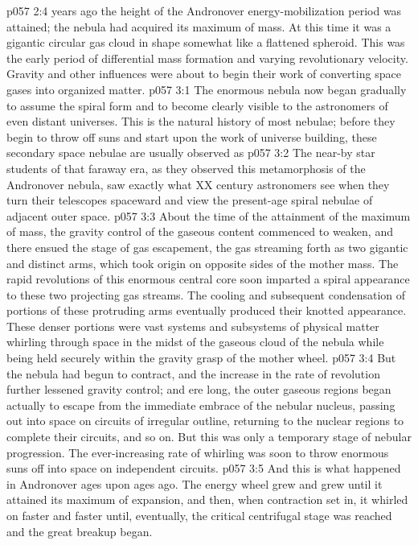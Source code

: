\vs p057 2:4 \pc {} years ago the height of the Andronover energy\hyp{}mobilization period was attained; the nebula had acquired its maximum of mass. At this time it was a gigantic circular gas cloud in shape somewhat like a flattened spheroid. This was the early period of differential mass formation and varying revolutionary velocity. Gravity and other influences were about to begin their work of converting space gases into organized matter.
\vs p057 3:1 The enormous nebula now began gradually to assume the spiral form and to become clearly visible to the astronomers of even distant universes. This is the natural history of most nebulae; before they begin to throw off suns and start upon the work of universe building, these secondary space nebulae are usually observed as 
\vs p057 3:2 The near\hyp{}by star students of that faraway era, as they observed this metamorphosis of the Andronover nebula, saw exactly what XX century astronomers see when they turn their telescopes spaceward and view the present\hyp{}age spiral nebulae of adjacent outer space.
\vs p057 3:3 About the time of the attainment of the maximum of mass, the gravity control of the gaseous content commenced to weaken, and there ensued the stage of gas escapement, the gas streaming forth as two gigantic and distinct arms, which took origin on opposite sides of the mother mass. The rapid revolutions of this enormous central core soon imparted a spiral appearance to these two projecting gas streams. The cooling and subsequent condensation of portions of these protruding arms eventually produced their knotted appearance. These denser portions were vast systems and subsystems of physical matter whirling through space in the midst of the gaseous cloud of the nebula while being held securely within the gravity grasp of the mother wheel.
\vs p057 3:4 But the nebula had begun to contract, and the increase in the rate of revolution further lessened gravity control; and ere long, the outer gaseous regions began actually to escape from the immediate embrace of the nebular nucleus, passing out into space on circuits of irregular outline, returning to the nuclear regions to complete their circuits, and so on. But this was only a temporary stage of nebular progression. The ever\hyp{}increasing rate of whirling was soon to throw enormous suns off into space on independent circuits.
\vs p057 3:5 And this is what happened in Andronover ages upon ages ago. The energy wheel grew and grew until it attained its maximum of expansion, and then, when contraction set in, it whirled on faster and faster until, eventually, the critical centrifugal stage was reached and the great breakup began.
